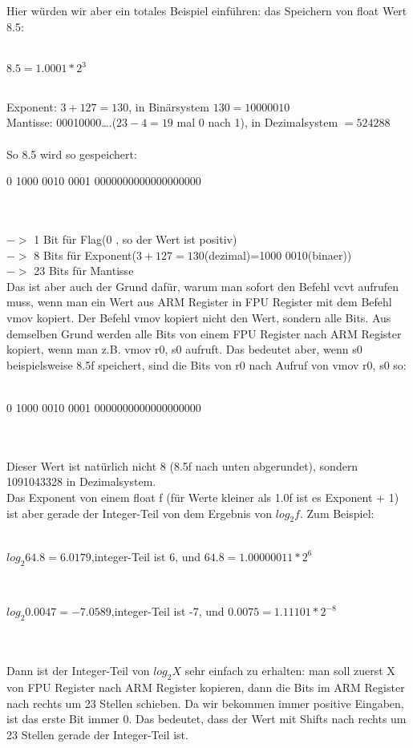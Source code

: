 \documentclass[11pt]{article}
\begin{document}
\begin{large}
Hier w\"urden wir aber ein totales Beispiel einf\"uhren: das Speichern von float Wert 8.5:\\\\
\centerline{$8.5 = 1.0001 * 2^3$}\\
Exponent: $3 + 127 = 130$, in Bin\"arsystem $130 = 1000 0010$ \\
Mantisse: 00010000….($23 - 4 = 19$ mal 0 nach 1), in Dezimalsystem $=524288$\\\\
So 8.5 wird so gespeichert:\\
\centerline{ {\color{blue}0 }	{\color{red}1000 0010 }	0001 0000000000000000000} \\\\
{\color{blue}$->$ 1 Bit f\"ur Flag(0 , so der Wert ist positiv)}\\
{\color{red}$->$ 8 Bits f\"ur Exponent($3+127=130$(dezimal)=1000 0010(binaer))}\\
$->$ 23 Bits f\"ur Mantisse \\
Das ist aber auch der Grund daf\"ur, warum man sofort den Befehl vcvt aufrufen muss, wenn man ein Wert aus ARM Register in FPU Register mit dem Befehl vmov kopiert. Der Befehl vmov kopiert nicht den Wert, sondern alle Bits. Aus demselben Grund werden alle Bits von einem FPU Register nach ARM Register kopiert, wenn man z.B. vmov r0, s0 aufruft. Das bedeutet aber, wenn s0 beispielsweise 8.5f speichert, sind die Bits von r0 nach Aufruf von vmov r0, s0 so:\\\\
\centerline{0	1000 0010	0001 0000000000000000000}\\\\
Dieser Wert ist nat\"urlich nicht 8 (8.5f nach unten abgerundet), sondern 1091043328 in Dezimalsystem.\\
Das Exponent von einem float f (f\"ur Werte kleiner als 1.0f ist es Exponent + 1) ist aber gerade der Integer-Teil von dem Ergebnis von $log_2{f}$. Zum Beispiel:\\\\
\centerline{$log_2{64.8}=6.0179$,integer-Teil ist 6, und $64.8 = 1.00000011 * 2^6$ }\\
\centerline{$log_2{0.0047}=-7.0589$,integer-Teil ist -7, und $0.0075 = 1.11101 * 2^{-8}$ }\\\\
Dann ist der Integer-Teil von $log_2{X}$ sehr einfach zu erhalten: man soll zuerst X von FPU Register nach ARM Register kopieren, dann die Bits im ARM Register nach rechts um 23 Stellen schieben. Da wir bekommen immer positive Eingaben, ist das erste Bit immer 0. Das bedeutet, dass der Wert mit Shifts nach rechts um 23 Stellen gerade der Integer-Teil ist. \\\\






\end{large} 
\end{document}

